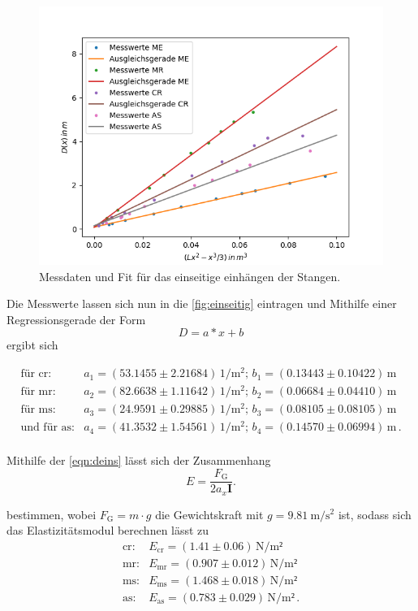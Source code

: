 \begin{figure}[H]
	\centering
	\includegraphics{Daten/AS1.png}
	\caption{Messdaten und Fit für das einseitige einhängen der Stangen.}
	\label{fig:einseitig}
\end{figure}

\noindent
Die Messwerte lassen sich nun in die \autoref{fig:einseitig} eintragen und Mithilfe einer Regressionsgerade der Form $$ D = a*x + b$$ ergibt sich

\begin{align*}
    \text{für cr}:& a_1 = (53.1455 \pm 2.21684) \, \si{1\per\meter^2} ; \, b_1 = (0.13443\pm 0.10422) \, \si{\meter}  \\
    \text{für mr}:& a_2 = (82.6638 \pm 1.11642 ) \, \si{1\per\meter^2} ;\, b_2 = (0.06684\pm 0.04410) \, \si{\meter}  \\
    \text{für ms}:& a_3 = (24.9591 \pm 0.29885) \, \si{1\per\meter^2} ; \, b_3 = (0.08105\pm 0.08105) \, \si{\meter}  \\
\text{und für as}:& a_4 = (41.3532 \pm 1.54561) \, \si{1\per\meter^2} ;\,  b_4 = (0.14570\pm 0.06994) \, \si{\meter} \, .\\
\end{align*} 

\noindent
Mithilfe der \autoref{eqn:deins} lässt sich der Zusammenhang
\begin{equation*}
    E = \frac{F_\text{G}}{2a_x\symbf{I}}.
\end{equation*}

\noindent
bestimmen, wobei $F_\text{G}= m \cdot g$ die Gewichtskraft mit $g = \SI{9.81}{\meter\per\second\squared}$ ist, sodass sich das Elastizitätsmodul berechnen lässt zu 
\begin{align*}
    \text{cr}:& E_\text{cr} = (1.41 \pm 0.06  )  \, \si{\newton\per\meter²}\\
    \text{mr}:& E_\text{mr} = (0.907 \pm 0.012) \, \si{\newton\per\meter²}\\
    \text{ms}:& E_\text{ms} = (1.468 \pm 0.018) \, \si{\newton\per\meter²}\\
    \text{as}:& E_\text{as} = (0.783\pm 0.029 ) \, \si{\newton\per\meter²} \, .\\
\end{align*} 

